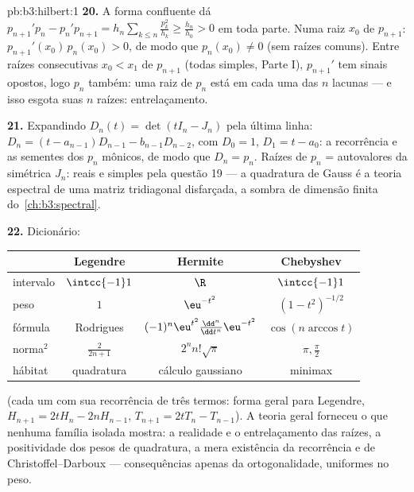 \begin{solution}{pb:b3:hilbert:1}
\textbf{20.} A forma confluente dá $p_{n+1}'p_n -
p_n'p_{n+1} = h_n\sum_{k\leq n}\frac{p_k^2}{h_k} \geq
\frac{h_n}{h_0} > 0$ em toda parte. Numa raiz $x_0$ de
$p_{n+1}$: $p_{n+1}'(x_0)\,p_n(x_0) > 0$, de modo que $p_n(x_0) \neq
0$ (sem raízes comuns). Entre raízes consecutivas $x_0 < x_1$
de $p_{n+1}$ (todas simples, Parte I), $p_{n+1}'$ tem sinais
opostos, logo $p_n$ também: uma raiz de $p_n$ está em cada uma
das $n$ lacunas --- e isso esgota suas $n$ raízes:
entrelaçamento.

\textbf{21.} Expandindo $D_n(t) = \det(tI_n - J_n)$ pela
última linha: $D_n = (t - a_{n-1})D_{n-1} - b_{n-1}D_{n-2}$,
com $D_0 = 1$, $D_1 = t - a_0$: a recorrência e as sementes dos
$p_n$ mônicos, de modo que $D_n = p_n$. Raízes de $p_n$ =
autovalores da simétrica $J_n$: reais e simples pela
questão 19 --- a quadratura de Gauss é a teoria espectral de uma
matriz tridiagonal disfarçada, a sombra de dimensão finita
do~\cref{ch:b3:spectral}.

\textbf{22.} Dicionário:
\begin{center}
\begin{tabular}{l|c|c|c}
 & Legendre & Hermite & Chebyshev\\
\hline
intervalo & $\intcc{-1}1$ & $\R$ & $\intcc{-1}1$\\
peso & $1$ & $\eu^{-t^2}$ & $(1-t^2)^{-1/2}$\\
fórmula & Rodrigues & $(-1)^n\eu^{t^2}
\frac{\dd^n}{\dd t^n}\eu^{-t^2}$ & $\cos(n\arccos t)$\\
norma$^2$ & $\frac2{2n+1}$ & $2^nn!\sqrt\pi$ & $\pi,
\frac\pi2$\\
hábitat & quadratura & cálculo gaussiano & minimax\\
\end{tabular}
\end{center}
(cada um com sua recorrência de três termos: forma geral para
Legendre, $H_{n+1} = 2tH_n - 2nH_{n-1}$, $T_{n+1} = 2tT_n -
T_{n-1}$). A teoria geral forneceu o que nenhuma família
isolada mostra: a realidade e o entrelaçamento das raízes, a positividade dos
pesos de quadratura, a mera existência da recorrência e
de Christoffel--Darboux --- consequências apenas da ortogonalidade,
uniformes no peso.


\end{solution}
